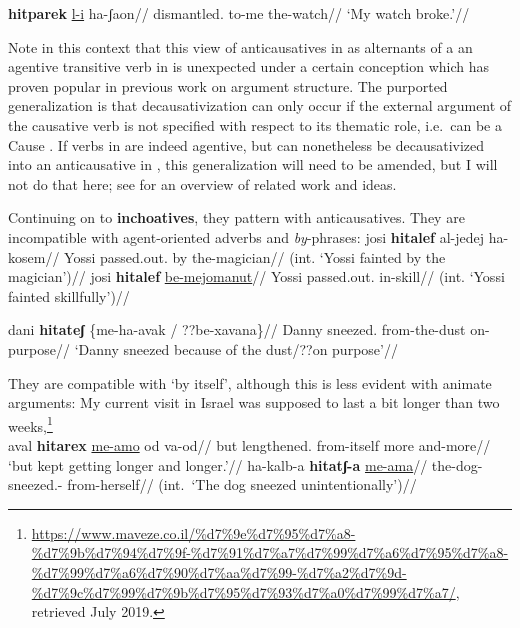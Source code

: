 \ex
\begingl
\gla \textbf{hitparek} \underline{l-i} ha-ʃaon//
\glb dismantled. to-me the-watch//
\glft `My watch broke.'//
\endgl
\xe

Note in this context that this view of anticausatives in {\thit} as alternants of a an agentive transitive verb in {\tpie} is unexpected under a certain conception which has proven popular in previous work on argument structure. The purported generalization is that decausativization can only occur if the external argument of the causative verb is not specified with respect to its thematic role, i.e.~can be a Cause \citep{unaccusativity95,reinhart02}. If verbs in {\tpie} are indeed agentive, but can nonetheless be decausativized into an anticausative in {\thit}, this generalization will need to be amended, but I will not do that here; see \citet[52]{layering15} for an overview of related work and ideas.


Continuing on to \textbf{inchoatives}, they pattern with anticausatives. They are incompatible with agent-oriented adverbs and \emph{by}-phrases:
\pex
		\a \ljudge{*} \begingl
			\gla josi \textbf{hitalef} al-jedej ha-kosem//
			\glb Yossi passed.out. by the-magician//
			\glft (int. `Yossi fainted by the magician')//
		\endgl
		\a {} \begingl
			\gla josi \textbf{hitalef} \underline{be-mejomanut}//
			\glb Yossi passed.out. in-skill//
			\glft (int. `Yossi fainted skillfully')//
		\endgl
\xe

\pex 
	\a \label{ex:incho1} \begingl
	\gla dani \textbf{hitateʃ} \{me-ha-avak / ??be-xavana\}//
	\glb Danny sneezed. \phantom{\{}from-the-dust {} \phantom{??}on-purpose//
	\glft `Danny sneezed because of the dust/??on purpose'//
	\endgl
\xe

They are compatible with `by itself', although this is less evident with animate arguments:
\pex \label{ex:thit-inch-byitself}
	\a My current visit in Israel was supposed to last a bit longer than two weeks,\footnote{
		\url{https://www.maveze.co.il/\%d7\%9e\%d7\%95\%d7\%a8-\%d7\%9b\%d7\%94\%d7\%9f-\%d7\%91\%d7\%a7\%d7\%99\%d7\%a6\%d7\%95\%d7\%a8-\%d7\%99\%d7\%a6\%d7\%90\%d7\%aa\%d7\%99-\%d7\%a2\%d7\%9d-\%d7\%9c\%d7\%99\%d7\%9b\%d7\%95\%d7\%93\%d7\%a0\%d7\%99\%d7\%a7/}, retrieved July 2019.}\\
		\begingl
			\gla aval \textbf{hitarex} \underline{me-a{\ts}mo} od va-od//
			\glb but lengthened. from-itself more and-more//
			\glft `but kept getting longer and longer.'//
		\endgl
	\a {}
		\begingl
			\gla ha-kalb-a \textbf{hitatʃ-a} \underline{me-a{\ts}ma}//
			\glb the-dog- sneezed.- from-herself//
			\glft (int.~`The dog sneezed unintentionally')//
		\endgl
\xe

